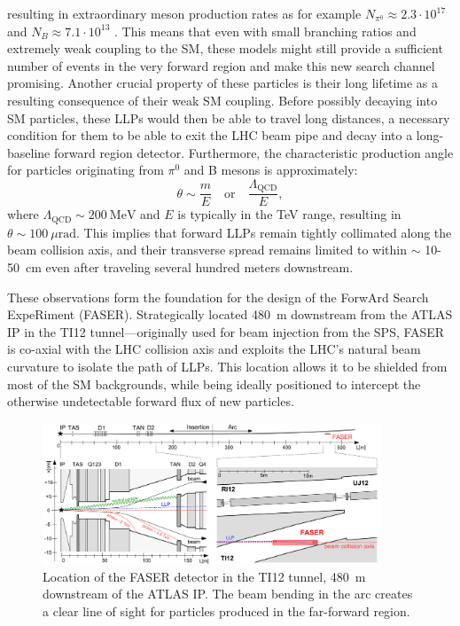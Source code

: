 	resulting in extraordinary meson production rates as for example $N_{\pi^0} \approx 2.3 \cdot 10^{17}$ and $N_{B} \approx 7.1 \cdot 10^{13}$ \cite{FASER_LLP}. This means that even with small branching ratios and extremely weak coupling to the SM, these models might still provide a sufficient number of events in the very forward region and make this new search channel promising.  Another crucial property of these particles is their long lifetime as a resulting consequence of their weak SM coupling. Before possibly decaying into SM particles, these LLPs would then be able to travel long distances, a necessary condition for them to be able to exit the LHC beam pipe and decay into a long-baseline forward region detector. Furthermore, the characteristic production angle for particles originating from $\pi^0$ and B mesons is approximately:  
	\begin{equation}
    	\theta \sim \frac{m}{E} \quad \text{or} \quad \frac{\Lambda_{\text{QCD}}}{E},
	\end{equation}
	where $\Lambda_{\text{QCD}} \sim 200~\mathrm{MeV}$ and $E$ is typically in the TeV range, resulting in $\theta \sim 100~\mu\mathrm{rad}$. This implies that forward LLPs remain tightly collimated along the beam collision axis, and their transverse spread remains limited to within $\sim$ 10-\SI{50}{\centi\meter} even after traveling several hundred meters downstream. 
	
	These observations form the foundation for the design of the ForwArd Search ExpeRiment (FASER). Strategically located \SI{480}{\meter} downstream from the ATLAS IP in the TI12 tunnel—originally used for beam injection from the SPS, FASER is co-axial with the LHC collision axis and exploits the LHC’s natural beam curvature to isolate the path of LLPs. This location allows it to be shielded from most of the SM backgrounds, while being ideally positioned to intercept the otherwise undetectable forward flux of new particles.
	
	\begin{figure}[H]
    	\centering
    	\includegraphics[width=0.9\textwidth]{files/FASER_location}
    	\caption{Location of the FASER detector in the TI12 tunnel, \SI{480}{\meter} downstream of the ATLAS IP. The beam bending in the arc creates a clear line of sight for particles produced in the far-forward region.}
    	\label{fig:faser_location}
	\end{figure}
	
